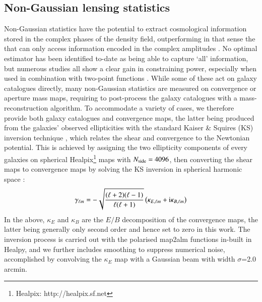  
\subsection{Non-Gaussian lensing statistics}
\label{subsec:beyond-2pt}

Non-Gaussian statistics have the potential to extract cosmological information stored in the complex phases of the density field, outperforming in that sense the \gtwopcf that can only access information encoded in the complex amplitudes \citep{2002MNRAS.337..488C}.
No optimal estimator has been identified to-date as being able to capture `all' information, but numerous studies all show a clear gain in constraining power, especially when used in combination with two-point functions \citep{Fu2014, Gruen2017, HD21, DESY3_Zuercher, HSCY1_peaks_sims, KiDS1000_Burger, KiDS1000_Map3, HOWLS_paper1}.
While some of these act on galaxy catalogues directly, many non-Gaussian statistics are measured on convergence or aperture mass maps, requiring to post-process the galaxy catalogues with a mass-reconstruction algorithm.
To accommodate a variety of cases, we therefore provide both galaxy catalogues and convergence maps, the latter being  produced from the galaxies' observed ellipticities with the standard Kaiser \& Squires (KS)  inversion technique \citep{KaiserSquires}, which relates the shear and convergence to the Newtonian potential. This is achieved by assigning the two ellipticity components of every galaxies on spherical {\sc Healpix}\footnote{{\sc Healpix}: http://healpix.sf.net}  maps \citep{healpix} with $N_{\rm side}=4096$, then converting the shear maps to convergence maps by solving  the KS inversion in spherical harmonic space \citep[][see their equation 10]{Gatti20}:
\begin{eqnarray}
\gamma_{\ell m} = - \sqrt{\frac{(\ell+2)(\ell - 1)}{\ell(\ell+1)}}\left( \kappa_{E,\ell m} + {\rm i} \kappa_{B,\ell m} \right)
\label{eq:KS}
\end{eqnarray}
In the above, $\kappa_{E}$ and $\kappa_{B}$ are the $E/B$ decomposition of the convergence maps, the latter being generally only second order and hence set to zero in this work. 
The inversion process is carried out with the polarised  {\sc map2alm} functions  in-built in {\sc Healpy}, and we further includes smoothing to suppress numerical noise, accomplished by convolving the $\kappa_E$ map with  a Gaussian beam with width $\sigma$=2.0 arcmin.

